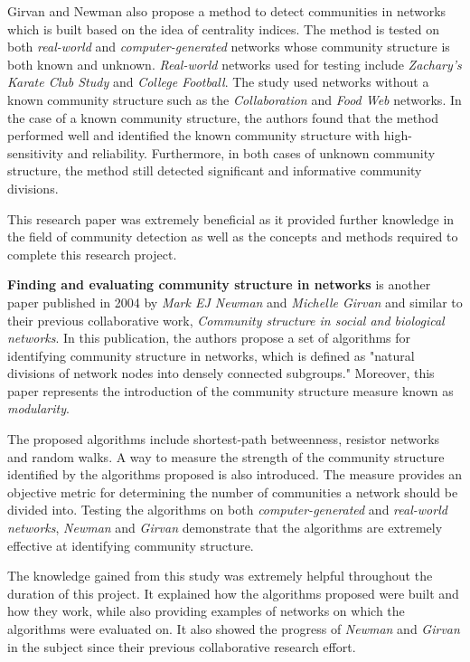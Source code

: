 Girvan and Newman also propose a method to detect communities in networks which is built based on the idea of centrality indices. The method is tested on both \textit{real-world} and \textit{computer-generated} networks whose community structure is both known and unknown. \textit{Real-world} networks used for testing include \textit{Zachary's Karate Club Study} and \textit{College Football}. The study used networks without a known community structure such as the \textit{Collaboration} and \textit{Food Web} networks. In the case of a known community structure, the authors found that the method performed well and identified the known community structure with high-sensitivity and reliability. Furthermore, in both cases of unknown community structure, the method still detected significant and informative community divisions.

This research paper was extremely beneficial as it provided further knowledge in the field of community detection as well as the concepts and methods required to complete this research project.

\vspace*{1em}

\textbf{Finding and evaluating community structure in networks}
\cite{newman2004finding} is another paper published in 2004 by \textit{Mark EJ Newman} and \textit{Michelle Girvan} and similar to their previous collaborative work, \textit{Community structure in social and biological networks}. In this publication, the authors propose a set of algorithms for identifying community structure in networks, which is defined as "natural divisions of network nodes into densely connected subgroups." Moreover, this paper represents the introduction of the community structure measure known as \textit{modularity}.

The proposed algorithms include shortest-path betweenness, resistor networks and random walks. A way to measure the strength of the community structure identified by the algorithms proposed is also introduced. The measure provides an objective metric for determining the number of communities a network should be divided into. Testing the algorithms on both \textit{computer-generated} and \textit{real-world networks}, \textit{Newman} and \textit{Girvan} demonstrate that the algorithms are extremely effective at identifying community structure.

The knowledge gained from this study was extremely helpful throughout the duration of this project. It explained how the algorithms proposed were built and how they work, while also providing examples of networks on which the algorithms were evaluated on. It also showed the progress of \textit{Newman} and \textit{Girvan} in the subject since their previous collaborative research effort.

